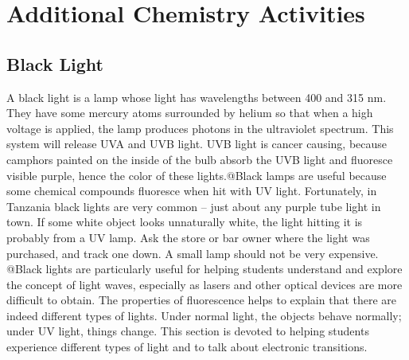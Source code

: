 \chapter{Additional Chemistry Activities}

\section{Black Light}

A black light is a lamp whose light has wavelengths between 400 and 315 nm. They have some mercury atoms surrounded by helium so that when a high voltage is applied, the lamp produces photons in the ultraviolet spectrum. This system will release UVA and UVB light. UVB light is cancer causing, because camphors painted on the inside of the bulb absorb the UVB light and fluoresce visible purple, hence the color of these lights.@Black lamps are useful because some chemical compounds fluoresce when hit with UV light. Fortunately, in Tanzania black lights are very common – just about any purple tube light in town. If some white object looks unnaturally white, the light hitting it is probably from a UV lamp. Ask the store or bar owner where the light was purchased, and track one down. A small lamp should not be very expensive. @Black lights are particularly useful for helping students understand and explore the concept of light waves, especially as lasers and other optical devices are more difficult to obtain. The properties of fluorescence helps to explain that there are indeed different types of lights. Under normal light, the objects behave normally; under UV light, things change. This section is devoted to helping students experience different types of light and to talk about electronic transitions.

